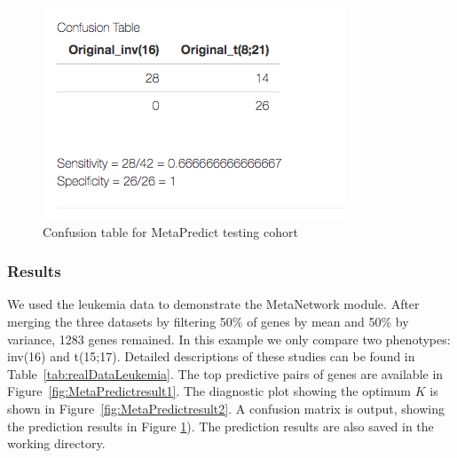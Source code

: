 \begin{figure}[H]
\begin{center}
\includegraphics[scale=0.5]{./figure/MetaPredict/MetaPredictresult3.png}
\caption{Confusion table for MetaPredict testing cohort}
\label{fig:MetaPredictresult3}
\end{center}
\end{figure}

\subsubsection{Results}

We used the leukemia data to demonstrate the MetaNetwork module.
After merging the three datasets by filtering 50\% of genes by mean and 50\% by variance, 1283 genes remained.
In this example we only compare two phenotypes: inv(16) and t(15;17). 
Detailed descriptions of these studies can be found in Table~\ref{tab:realDataLeukemia}. 
The top predictive pairs of genes are available in Figure~\ref{fig:MetaPredictresult1}.
The diagnostic plot showing the optimum $K$ is shown in Figure~\ref{fig:MetaPredictresult2}.
A confusion matrix is output,  
showing the prediction results  in Figure \ref{fig:MetaPredictresult3}).
The prediction results are also saved in the working directory.

